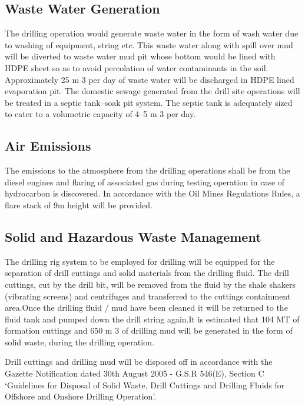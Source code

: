 \documentclass[11pt,a4paper]{article}
\begin{document}
\subsection{\textbf{Waste Water Generation}}

The drilling operation would generate waste water in the form of wash water due to washing of equipment, string etc. This waste water along with spill over mud will be diverted to waste water mud pit whose bottom would be lined with HDPE sheet so as to avoid percolation of water contaminants in the soil. Approximately 25 m 3 per day of waste water will be discharged in HDPE lined evaporation pit. The domestic sewage generated from the drill site operations will be treated in a septic tank–soak pit system. The septic tank is adequately sized to cater to a volumetric capacity of 4–5 m 3 per day.

\subsection{\textbf{Air Emissions}}

The emissions to the atmosphere from the drilling operations shall be from the diesel engines and flaring of associated gas during testing operation in case of hydrocarbon is discovered. In accordance with the Oil Mines Regulations Rules, a flare stack of 9m height will be provided.

\subsection{\textbf{Solid and Hazardous Waste Management}}

The drilling rig system to be employed for drilling will be equipped for the separation of drill cuttings and solid materials from the drilling fluid. The drill cuttings, cut by the drill bit, will be removed from the fluid by the shale shakers (vibrating screens) and centrifuges and transferred to the cuttings containment area.Once the drilling fluid / mud have been cleaned it will be returned to the fluid tank and pumped down the drill string again.It is estimated that 104 MT of formation cuttings and 650 m 3 of drilling mud will be generated in the form of solid waste, during the drilling operation.

Drill cuttings and drilling mud will be disposed off in accordance with the Gazette Notification dated 30th August 2005 - G.S.R 546(E), Section C ‘Guidelines for Disposal of Solid Waste, Drill Cuttings and Drilling Fluids for Offshore and Onshore Drilling
Operation’. 
\end{document}
